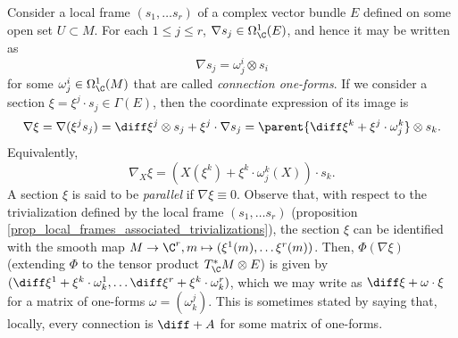 \begin{obs} \label{coordinate_exp_connection}
    Consider a local frame \((s_1, \ldots s_r)\) of a complex vector bundle \(E\) defined on some open set \(U \subset M\). For each \(1 \leq j \leq r\), \(\nabla s_j \in \Omega_\C^1(E)\), and hence it may be written as
    \begin{equation} \label{def_connection_1_form}
    \nabla s_j = \omega^i_j \otimes s_i
    \end{equation}
    for some \(\omega^i_j \in \Omega_\C^1(M)\) that are called \textit{connection one-forms}. If we consider a section \(\xi=\xi^j\cdot  s_j \in \Gamma(E)\), then the coordinate expression of its image is
    \[
    \nabla \xi = \nabla(\xi^j s_j) = \diff \xi^j \otimes s_j + \xi^j \cdot  \nabla s_j = \parent{\diff \xi^k + \xi^j \cdot \omega^k_j} \otimes s_k.
    \]
    Equivalently,
    \[
    \nabla_X \xi = (X(\xi^k)+\xi^k \cdot \omega^k_j(X)) \cdot s_k.
    \]
    A section \(\xi\) is said to be \textit{parallel} if \(\nabla \xi \equiv 0\). Observe that, with respect to the trivialization defined by the local frame \((s_1, \ldots s_r)\) (proposition \ref{prop_local_frames_associated_trivializations}), the section \(\xi\) can be identified with the smooth map \(M \to \C^r, m \mapsto (\xi^1(m), \ldots \xi^r(m))\). Then, \(\Phi(\nabla \xi)\) (extending \(\Phi\) to the tensor product \(T_\C^*M \otimes E\)) is given by \((\diff \xi^1+\xi^k\cdot \omega_k^1, \ldots \diff \xi^r + \xi^k \cdot \omega_k^r)\), which we may write as \(\diff \xi + \omega \cdot \xi\) for a matrix of one-forms \(\omega=(\omega^j_k)\). This is sometimes stated by saying that, locally, every connection is \(\diff+ A\) for some matrix of one-forms. \newline \newline


\end{obs}

